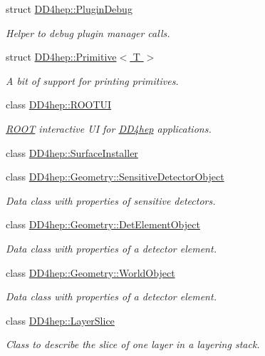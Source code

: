 \begin{DoxyCompactItemize}
struct \hyperlink{struct_d_d4hep_1_1_plugin_debug}{D\+D4hep\+::\+Plugin\+Debug}
\begin{DoxyCompactList}\small\item\em Helper to debug plugin manager calls. \end{DoxyCompactList}\item 
struct \hyperlink{struct_d_d4hep_1_1_primitive}{D\+D4hep\+::\+Primitive$<$ T $>$}
\begin{DoxyCompactList}\small\item\em A bit of support for printing primitives. \end{DoxyCompactList}\item 
class \hyperlink{class_d_d4hep_1_1_r_o_o_t_u_i}{D\+D4hep\+::\+R\+O\+O\+T\+UI}
\begin{DoxyCompactList}\small\item\em \hyperlink{namespace_r_o_o_t}{R\+O\+OT} interactive UI for \hyperlink{namespace_d_d4hep}{D\+D4hep} applications. \end{DoxyCompactList}\item 
class \hyperlink{class_d_d4hep_1_1_surface_installer}{D\+D4hep\+::\+Surface\+Installer}
\item 
class \hyperlink{class_d_d4hep_1_1_geometry_1_1_sensitive_detector_object}{D\+D4hep\+::\+Geometry\+::\+Sensitive\+Detector\+Object}
\begin{DoxyCompactList}\small\item\em Data class with properties of sensitive detectors. \end{DoxyCompactList}\item 
class \hyperlink{class_d_d4hep_1_1_geometry_1_1_det_element_object}{D\+D4hep\+::\+Geometry\+::\+Det\+Element\+Object}
\begin{DoxyCompactList}\small\item\em Data class with properties of a detector element. \end{DoxyCompactList}\item 
class \hyperlink{class_d_d4hep_1_1_geometry_1_1_world_object}{D\+D4hep\+::\+Geometry\+::\+World\+Object}
\begin{DoxyCompactList}\small\item\em Data class with properties of a detector element. \end{DoxyCompactList}\item 
class \hyperlink{class_d_d4hep_1_1_layer_slice}{D\+D4hep\+::\+Layer\+Slice}
\begin{DoxyCompactList}\small\item\em Class to describe the slice of one layer in a layering stack. \end{DoxyCompactList}\item 

\end{DoxyCompactItemize}
